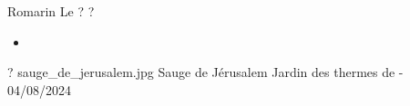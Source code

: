 \ficheidentiteplante
{Romarin}
{%
    Le  
}
{%
    ?
}
{%
    ?
}
{%
    \begin{itemize}[label = \bcplume]
        \item 
    \end{itemize}
}
{%
    ?
}
{%
    sauge_de_jerusalem.jpg
}
{%
    Sauge de Jérusalem
}
{%
    Jardin des thermes de  - 04/08/2024 
}